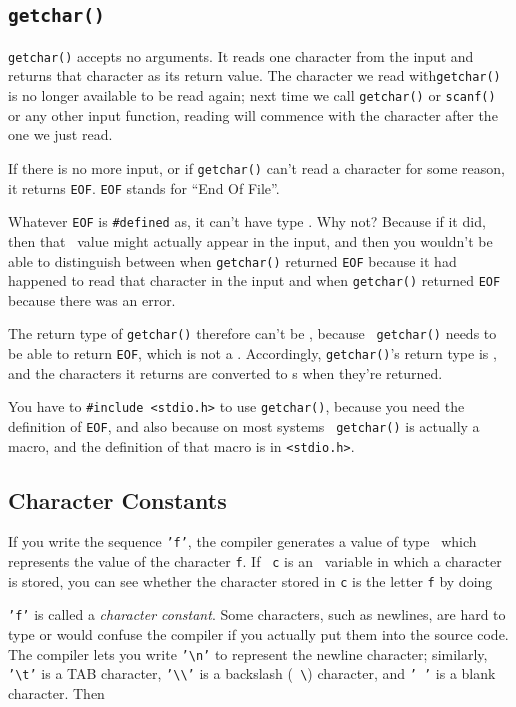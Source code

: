 \subsection{{\tt getchar()}}

{\tt getchar()} accepts no arguments.  It reads one character from the
input and returns that character as its return value.  The character we
read with{\tt getchar()} is no longer available to be read again; next
time we call {\tt getchar()} or {\tt scanf()} or any other input
function, reading will commence with the character after the one we just
read.

If there is no more input, or if {\tt getchar()} can't read a character
for some reason, it returns {\tt EOF}.  {\tt EOF} stands for ``End Of
File''.  

Whatever {\tt EOF} is {\tt\#defined} as, it can't have type \chr.  Why
not?  Because if it did, then that \chr\ value might actually appear in
the input, and then you wouldn't be able to distinguish between when
{\tt getchar()} returned {\tt EOF} because it had happened to read that
character in the input and when {\tt getchar()} returned {\tt EOF}
because there was an error.  

The return type of {\tt getchar()} therefore can't be \chr, because {\tt
getchar()} needs to be able to return {\tt EOF}, which is not a \chr.
Accordingly, {\tt getchar()}'s return type is \int, and the characters
it returns are converted to \int s when they're returned.

You have to {\tt\#include <stdio.h>} to use {\tt getchar()}, because you
need the definition of {\tt EOF}, and also because on most systems {\tt
getchar()} is actually a macro, and the definition of that macro is in
{\tt <stdio.h>}.

\subsection{Character Constants}

If you write the sequence {\tt 'f'}, the compiler generates a value of
type \int\ which represents the value of the character {\tt f}.  If {\tt
c} is an \int\ variable in which a character is stored, you can see
whether the character stored in {\tt c} is the letter {\tt f} by doing

\begin{flushleft}
\verb% if (c == 'f') { ... } % 
\end{flushleft}

{\tt 'f'} is called a {\em character constant}\/.  Some characters, such
as newlines, are hard to type or would confuse the compiler if you
actually put them into the source code.  The compiler lets you write
{\tt '\verb+\+n'} to represent the newline character; similarly, {\tt
'\verb+\+t'} is a TAB character, {\tt '\verb+\\+'} is a backslash ({\tt
\verb+\+}) character, and {\tt ' '} is a blank character.  Then

